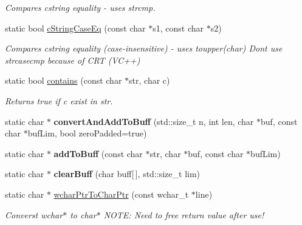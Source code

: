 \begin{DoxyCompactItemize}
\begin{DoxyCompactList}\small\item\em Compares cstring equality -\/ uses strcmp. \end{DoxyCompactList}\item 
\hypertarget{classel_1_1base_1_1utils_1_1Str_aaa37755d713b5e6475950134ce9ce0e8}{static bool \hyperlink{classel_1_1base_1_1utils_1_1Str_aaa37755d713b5e6475950134ce9ce0e8}{c\-String\-Case\-Eq} (const char $\ast$s1, const char $\ast$s2)}\label{classel_1_1base_1_1utils_1_1Str_aaa37755d713b5e6475950134ce9ce0e8}

\begin{DoxyCompactList}\small\item\em Compares cstring equality (case-\/insensitive) -\/ uses toupper(char) Dont use strcasecmp because of C\-R\-T (V\-C++) \end{DoxyCompactList}\item 
\hypertarget{classel_1_1base_1_1utils_1_1Str_a27cc1c1625b21597eb75df62b8fca0f8}{static bool \hyperlink{classel_1_1base_1_1utils_1_1Str_a27cc1c1625b21597eb75df62b8fca0f8}{contains} (const char $\ast$str, char c)}\label{classel_1_1base_1_1utils_1_1Str_a27cc1c1625b21597eb75df62b8fca0f8}

\begin{DoxyCompactList}\small\item\em Returns true if c exist in str. \end{DoxyCompactList}\item 
\hypertarget{classel_1_1base_1_1utils_1_1Str_a5e12c163bf1085441ea5453fd6c62fa0}{static char $\ast$ {\bfseries convert\-And\-Add\-To\-Buff} (std\-::size\-\_\-t n, int len, char $\ast$buf, const char $\ast$buf\-Lim, bool zero\-Padded=true)}\label{classel_1_1base_1_1utils_1_1Str_a5e12c163bf1085441ea5453fd6c62fa0}

\item 
\hypertarget{classel_1_1base_1_1utils_1_1Str_aa6a96f625f71661c02ecd5366533abaa}{static char $\ast$ {\bfseries add\-To\-Buff} (const char $\ast$str, char $\ast$buf, const char $\ast$buf\-Lim)}\label{classel_1_1base_1_1utils_1_1Str_aa6a96f625f71661c02ecd5366533abaa}

\item 
\hypertarget{classel_1_1base_1_1utils_1_1Str_adf0c36c9b8276ede18111a866e31db8b}{static char $\ast$ {\bfseries clear\-Buff} (char buff\mbox{[}$\,$\mbox{]}, std\-::size\-\_\-t lim)}\label{classel_1_1base_1_1utils_1_1Str_adf0c36c9b8276ede18111a866e31db8b}

\item 
\hypertarget{classel_1_1base_1_1utils_1_1Str_a6dc022e7e8d4cbf2c80ba9e1354feaea}{static char $\ast$ \hyperlink{classel_1_1base_1_1utils_1_1Str_a6dc022e7e8d4cbf2c80ba9e1354feaea}{wchar\-Ptr\-To\-Char\-Ptr} (const wchar\-\_\-t $\ast$line)}\label{classel_1_1base_1_1utils_1_1Str_a6dc022e7e8d4cbf2c80ba9e1354feaea}

\begin{DoxyCompactList}\small\item\em Converst wchar$\ast$ to char$\ast$ N\-O\-T\-E\-: Need to free return value after use! \end{DoxyCompactList}\end{DoxyCompactItemize}


